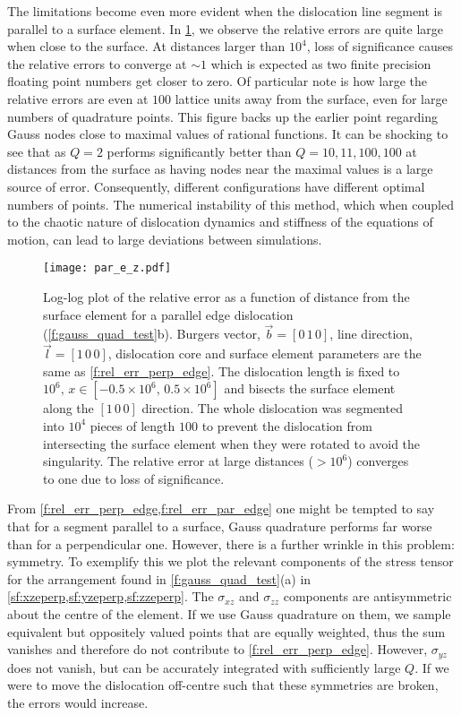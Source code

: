 The limitations become even more evident when the dislocation line segment is parallel to a surface element. In \cref{f:rel_err_par_edge}, we observe the relative errors are quite large when close to the surface. At distances larger than $10^4$, loss of significance causes the relative errors to converge at $\sim 1$ which is expected as two finite precision floating point numbers get closer to zero. Of particular note is how large the relative errors are even at $100$ lattice units away from the surface, even for large numbers of quadrature points. This figure backs up the earlier point regarding Gauss nodes close to maximal values of rational functions. It can be shocking to see that as $Q = 2$ performs significantly better than $Q = 10, 11, 100, 100$ at distances from the surface as having nodes near the maximal values is a large source of error. Consequently, different configurations have different optimal numbers of points. The numerical instability of this method, which when coupled to the chaotic nature of dislocation dynamics and stiffness of the equations of motion, can lead to large deviations between simulations.
\begin{figure}
    \centering
    \texttt{[image: par\_e\_z.pdf]}
    \caption[Relative error for an edge dislocation parallel to a surface element.]{Log-log plot of the relative error as a function of distance from the surface element for a parallel edge dislocation (\cref{f:gauss_quad_test}b). Burgers vector, $\vec{b} = [0\, 1\, 0]$, line direction, $\vec{l} = [1\, 0\, 0]$, dislocation core and surface element parameters are the same as \cref{f:rel_err_perp_edge}. The dislocation length is fixed to $10^{6},\, x\in\left[-0.5\times10^{6},\, 0.5\times10^{6} \right]$ and bisects the surface element along the $[1\, 0\, 0]$ direction. The whole dislocation was segmented into $10^4$ pieces of length $100$ to prevent the dislocation from intersecting the surface element when they were rotated to avoid the singularity. The relative error at large distances ($>10^6$) converges to one due to loss of significance.}
    \label{f:rel_err_par_edge}
\end{figure}

From \cref{f:rel_err_perp_edge,f:rel_err_par_edge} one might be tempted to say that for a segment parallel to a surface, Gauss quadrature performs far worse than for a perpendicular one. However, there is a further wrinkle in this problem: symmetry. To exemplify this we plot the relevant components of the stress tensor for the arrangement found in \cref{f:gauss_quad_test}(a) in \cref{sf:xzeperp,sf:yzeperp,sf:zzeperp}. The $\sigma_{xz}$ and $\sigma_{zz}$ components are antisymmetric about the centre of the element. If we use Gauss quadrature on them, we sample equivalent but oppositely valued points that are equally weighted, thus the sum vanishes and therefore do not contribute to \cref{f:rel_err_perp_edge}. However, $\sigma_{yz}$ does not vanish, but can be accurately integrated with sufficiently large $Q$. If we were to move the dislocation off-centre such that these symmetries are broken, the errors would increase.

